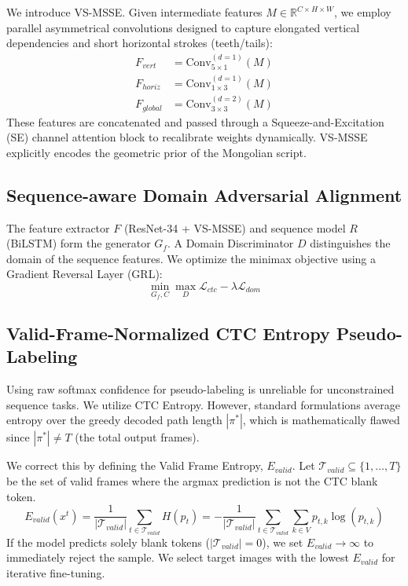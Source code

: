 \documentclass[11pt]{article}
\begin{document}
We introduce VS-MSSE. Given intermediate features $M \in \mathbb{R}^{C \times H \times W}$, we employ parallel asymmetrical convolutions designed to capture elongated vertical dependencies and short horizontal strokes (teeth/tails):
\begin{align}
    F_{vert} &= \text{Conv}_{5\times1}^{(d=1)}(M) \\
    F_{horiz} &= \text{Conv}_{1\times3}^{(d=1)}(M) \\
    F_{global} &= \text{Conv}_{3\times3}^{(d=2)}(M)
\end{align}
These features are concatenated and passed through a Squeeze-and-Excitation (SE) channel attention block to recalibrate weights dynamically. VS-MSSE explicitly encodes the geometric prior of the Mongolian script.

\subsection{Sequence-aware Domain Adversarial Alignment}
The feature extractor $F$ (ResNet-34 + VS-MSSE) and sequence model $R$ (BiLSTM) form the generator $G_f$. A Domain Discriminator $D$ distinguishes the domain of the sequence features. We optimize the minimax objective using a Gradient Reversal Layer (GRL):
\begin{equation}
    \min_{G_f, C} \max_{D} \mathcal{L}_{ctc} - \lambda \mathcal{L}_{dom}
\end{equation}

\subsection{Valid-Frame-Normalized CTC Entropy Pseudo-Labeling}
Using raw softmax confidence for pseudo-labeling is unreliable for unconstrained sequence tasks. We utilize CTC Entropy. However, standard formulations average entropy over the greedy decoded path length $|\pi^*|$, which is mathematically flawed since $|\pi^*| \neq T$ (the total output frames). 

We correct this by defining the Valid Frame Entropy, $E_{valid}$. Let $\mathcal{T}_{valid} \subseteq \{1, \dots, T\}$ be the set of valid frames where the argmax prediction is not the CTC blank token.
\begin{equation}
    E_{valid}(x^t) = \frac{1}{|\mathcal{T}_{valid}|} \sum_{t \in \mathcal{T}_{valid}} H(p_{t}) = -\frac{1}{|\mathcal{T}_{valid}|} \sum_{t \in \mathcal{T}_{valid}} \sum_{k \in V} p_{t,k} \log(p_{t,k})
\end{equation}
If the model predicts solely blank tokens ($|\mathcal{T}_{valid}|=0$), we set $E_{valid} \rightarrow \infty$ to immediately reject the sample. We select target images with the lowest $E_{valid}$ for iterative fine-tuning.
\end{document}
